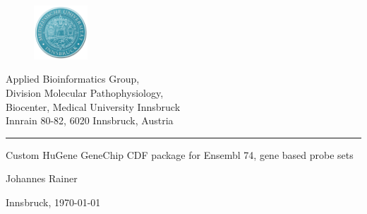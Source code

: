 \documentclass[a4paper,10pt,american]{report}
\begin{document}
\begin{titlepage}

 \begin{center}
   \parbox[t]{9cm}{
     \begin{figure}
        \includegraphics[width=2cm]{./images/MUIlogo-2.png}
      \end{figure}
      \parbox[t]{7.8cm}{
      \vspace{0.4cm}
      \raggedright
      \normalsize
      Applied Bioinformatics Group,\\
      Division Molecular Pathophysiology,\\
      Biocenter, Medical University Innsbruck\\
      Innrain 80-82, 6020 Innsbruck, Austria\\
      \noindent\rule[1ex]{\linewidth}{1pt}
      }
    }
  \end{center}
\vspace{6.5cm}
    \begin{center}
     \Large
     Custom HuGene GeneChip CDF package for Ensembl 74, gene based
     probe sets
    \end{center}

\vspace{1.5cm}

    \begin{center}
     \large
     Johannes Rainer
    \end{center}

\vspace{7.5cm}
   \vfill
   \begin{center}
     \normalsize
     Innsbruck, \today \\
   \end{center}
\end{titlepage}



\pagebreak

  \pagebreak

  \setcounter{secnumdepth}{0}

  \setcounter{secnumdepth}{3}

  \setcounter{page}{1}


\end{document}
